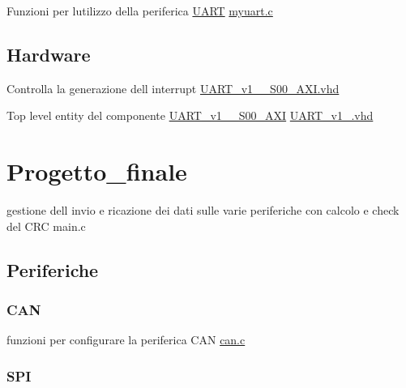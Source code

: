 \begin{DoxyItemize}
\item Funzioni per l\textquotesingle{}utilizzo della periferica \hyperlink{structUART}{U\+A\+RT}  \hyperlink{myuart_8c}{myuart.\+c} 
\end{DoxyItemize}\hypertarget{index_Hardware}{}\subsection{Hardware}\label{index_Hardware}

\begin{DoxyItemize}
\item Controlla la generazione dell\textquotesingle{} interrupt \hyperlink{UART__v1__0__S00__AXI_8vhd}{U\+A\+R\+T\+\_\+v1\+\_\+\_\+\+S00\+\_\+\+A\+X\+I.\+vhd}
\item Top level entity del componente \hyperlink{classUART__v1__0__S00__AXI}{U\+A\+R\+T\+\_\+v1\+\_\+\_\+\+S00\+\_\+\+A\+XI} \hyperlink{UART__v1__0_8vhd}{U\+A\+R\+T\+\_\+v1\+\_.\+vhd} 
\end{DoxyItemize}\hypertarget{index_Progetto_finale}{}\section{Progetto\+\_\+finale}\label{index_Progetto_finale}

\begin{DoxyItemize}
\item gestione dell\textquotesingle{} invio e ricazione dei dati sulle varie periferiche con calcolo e check del C\+RC main.\+c 
\end{DoxyItemize}\hypertarget{index_Periferiche}{}\subsection{Periferiche}\label{index_Periferiche}
\hypertarget{index_CAN}{}\subsubsection{C\+AN}\label{index_CAN}

\begin{DoxyItemize}
\item funzioni per configurare la periferica C\+AN \hyperlink{can_8c}{can.\+c} 
\end{DoxyItemize}\hypertarget{index_SPI}{}\subsubsection{S\+PI}\label{index_SPI}

